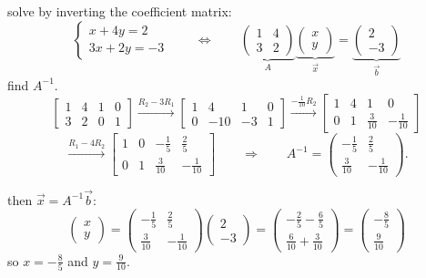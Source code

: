 \documentclass[12pt]{article}
\begin{document}
solve by inverting the coefficient matrix:
\[
\begin{cases} x + 4y = 2 \\ 3x + 2y = -3 \end{cases}
\qquad\Longleftrightarrow\qquad
\underbrace{\begin{pmatrix} 1 & 4 \\ 3 & 2 \end{pmatrix}}_{A}
\underbrace{\begin{pmatrix} x \\ y \end{pmatrix}}_{\vec{x}}
=
\underbrace{\begin{pmatrix} 2 \\ -3 \end{pmatrix}}_{\vec{b}}
\]
find $A^{-1}$.
\[
\left[\begin{array}{rr|rr}
1 & 4 & 1 & 0 \\
3 & 2 & 0 & 1
\end{array}\right]
\xrightarrow{R_2 - 3R_1}
\left[\begin{array}{rr|rr}
1 & 4 & 1 & 0 \\
0 & -10 & -3 & 1
\end{array}\right]
\xrightarrow{-\frac{1}{10}R_2}
\left[\begin{array}{rr|rr}
1 & 4 & 1 & 0 \\[2pt]
0 & 1 & \frac{3}{10} & -\frac{1}{10}
\end{array}\right]
\]
\[
\xrightarrow{R_1 - 4R_2}
\left[\begin{array}{rr|rr}
1 & 0 & -\frac{1}{5} & \frac{2}{5} \\[4pt]
0 & 1 & \frac{3}{10} & -\frac{1}{10}
\end{array}\right]
\qquad\Longrightarrow\qquad
A^{-1} = \begin{pmatrix} -\frac{1}{5} & \frac{2}{5} \\[4pt] \frac{3}{10} & -\frac{1}{10} \end{pmatrix}.
\]

then $\vec{x} = A^{-1}\vec{b}$:
\[
\begin{pmatrix} x \\ y \end{pmatrix}
= \begin{pmatrix} -\frac{1}{5} & \frac{2}{5} \\[4pt] \frac{3}{10} & -\frac{1}{10} \end{pmatrix}
\begin{pmatrix} 2 \\ -3 \end{pmatrix}
= \begin{pmatrix} -\frac{2}{5} - \frac{6}{5} \\[4pt] \frac{6}{10} + \frac{3}{10} \end{pmatrix}
= \begin{pmatrix} -\frac{8}{5} \\[4pt] \frac{9}{10} \end{pmatrix}
\]
so $x = -\frac{8}{5}$ and $y = \frac{9}{10}$.
\end{document}
